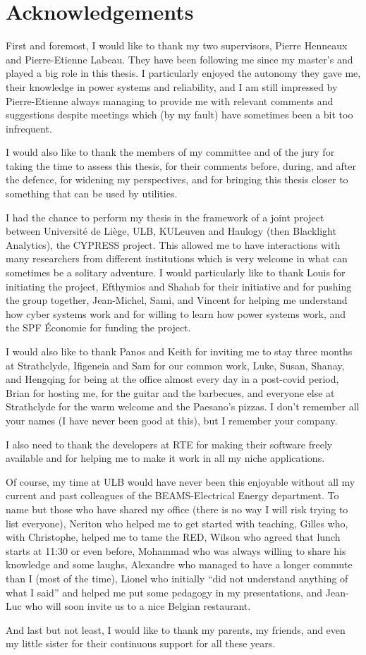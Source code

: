 \chapter*{Acknowledgements}

First and foremost, I would like to thank my two supervisors, Pierre Henneaux and Pierre-Etienne Labeau. They have been following me since my master's and played a big role in this thesis. I particularly enjoyed the autonomy they gave me, their knowledge in power systems and reliability, and I am still impressed by Pierre-Etienne always managing to provide me with relevant comments and suggestions despite meetings which (by my fault) have sometimes been a bit too infrequent.

I would also like to thank the members of my committee and of the jury for taking the time to assess this thesis, for their comments before, during, and after the defence, for widening my perspectives, and for bringing this thesis closer to something that can be used by utilities.

I had the chance to perform my thesis in the framework of a joint project between Université de Liège, ULB, KULeuven and Haulogy (then Blacklight Analytics), the CYPRESS project. This allowed me to have interactions with many researchers from different institutions which is very welcome in what can sometimes be a solitary adventure. I would particularly like to thank Louis for initiating the project, Efthymios and Shahab for their initiative and for pushing the group together, Jean-Michel, Sami, and Vincent for helping me understand how cyber systems work and for willing to learn how power systems work, and the SPF Économie for funding the project.

I would also like to thank Panos and Keith for inviting me to stay three months at Strathclyde, Ifigeneia and Sam for our common work, Luke, Susan, Shanay, and Hengqing for being at the office almost every day in a post-covid period, Brian for hosting me, for the guitar and the barbecues, and everyone else at Strathclyde for the warm welcome and the Paesano's pizzas. I don't remember all your names (I have never been good at this), but I remember your company.

I also need to thank the \Dynawo{} developers at RTE for making their software freely available and for helping me to make it work in all my niche applications.

Of course, my time at ULB would have never been this enjoyable without all my current and past colleagues of the BEAMS-Electrical Energy department. To name but those who have shared my office (there is no way I will risk trying to list everyone), Neriton who helped me to get started with teaching, Gilles who, with Christophe, helped me to tame the RED, Wilson who agreed that lunch starts at 11:30 or even before, Mohammad who was always willing to share his knowledge and some laughs, Alexandre who managed to have a longer commute than I (most of the time), Lionel who initially ``did not understand anything of what I said'' and helped me put some pedagogy in my presentations, and Jean-Luc who will soon invite us to a nice Belgian restaurant.

And last but not least, I would like to thank my parents, my friends, and even my little sister for their continuous support for all these years.